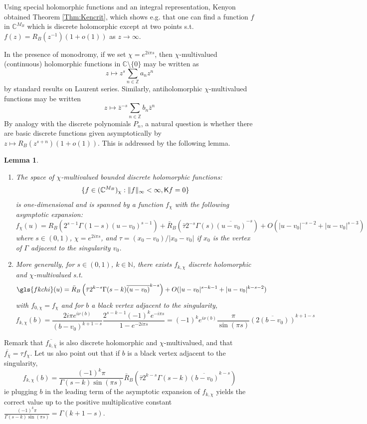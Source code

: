 \documentclass[10pt]{article}
\newcommand{\Z}{\mathbb{Z}}
\newcommand{\N}{\mathbb{N}}
\newcommand{\C}{\mathbb{C}}
\newcommand{\rK}{{\sf K}}
\newtheorem{Lem}[thm]{Lemma}
\begin{document}
Using special holomorphic functions and an integral representation, Kenyon obtained Theorem \ref{Thm:Kencrit}, which shows e.g. that one can find a function $f$ in $\C^{M_B}$ which is discrete holomorphic except at two points s.t. $f(z)=R_B(z^{-1})(1+o(1))$ as $z\rightarrow\infty$.

In the presence of monodromy, if we set $\chi=e^{2i\pi s}$, then $\chi$-multivalued (continuous) holomorphic functions in $\C\setminus\{0\}$ may be written as
$$z\longmapsto z^s\sum_{n\in\Z}a_nz^n$$
by standard results on Laurent series. Similarly, antiholomorphic $\chi$-multivalued functions may be written
$$z\longmapsto \bar z^{-s}\sum_{n\in\Z}b_n\bar z^n$$
By analogy with the discrete polynomials $P_n$, a natural question is whether there are basic discrete functions given asymptotically by $z\mapsto R_B(z^{s+n})(1+o(1))$. This is addressed by the following lemma.



\begin{Lem}\label{Lem:monholom}
\begin{enumerate}
\item
The space of $\chi$-multivalued bounded discrete holomorphic functions:
$$\{f\in(\C^{M_B})_\chi: \|f\|_\infty<\infty, \rK f=0\}$$
is one-dimensional and is spanned by a function $f_\chi$ with the following asymptotic expansion:
$$f_\chi(u)=R_B\left(2^{s-1}\Gamma(1-s)(u-v_0)^{s-1}\right)+\bar R_B\left(\bar\tau 2^{-s}\Gamma(s)\overline{(u-v_0)}^{-s}\right)+O(|u-v_0|^{-s-2}+|u-v_0|^{s-3})$$
where $s\in (0,1)$, $\chi=e^{2i\pi s}$, and $\tau=(x_0-v_0)/|x_0-v_0|$ if $x_0$ is the vertex of $\Gamma$ adjacent to the singularity $v_0$.
\item More generally, for $s\in (0,1)$, $k\in\N$, there exists $f_{k,\chi}$ discrete holomorphic and $\chi$-multivalued s.t.
$$\gls{fkchi}(u)=\bar R_B\left(\bar\tau 2^{k-s}\Gamma(s-k)\overline{(u-v_0)}^{k-s}\right)+O(|u-v_0|^{s-k-1}+|u-v_0|^{k-s-2})$$
with $f_{0,\chi}=f_\chi$ and for $b$ a black vertex adjacent to the singularity,
$$f_{k,\chi}(b)=\frac{2i\pi e^{i\nu(b)}}{(b-v_0)^{k+1-s}}\frac{2^{s-k-1}(-1)^ke^{-i\pi s}}{1-e^{-2i\pi s}}=(-1)^ke^{i\nu(b)}\frac{\pi}{\sin(\pi s)}\overline{(2(b-v_0))}^{k+1-s}$$
\end{enumerate}
\end{Lem}
Remark that $\overline{f_{k,\bar\chi}}$ is also discrete holomorphic and $\chi$-multivalued, and that $\overline{f_{\bar\chi}}=\tau f_\chi$. 
Let us also point out that if $b$ is a black vertex adjacent to the singularity,
$$f_{k,\chi}(b)=\frac{(-1)^k\pi}{\Gamma(s-k)\sin(\pi s)}\bar R_B\left(\bar\tau 2^{k-s}\Gamma(s-k)\overline{(b-v_0)}^{k-s}\right)$$
ie plugging $b$ in the leading term of the asymptotic expansion of $f_{k,\chi}$ yields the correct value up to the positive multiplicative constant $\frac{(-1)^k\pi}{\Gamma(s-k)\sin(\pi s)}=\Gamma(k+1-s)$.
\end{document}
